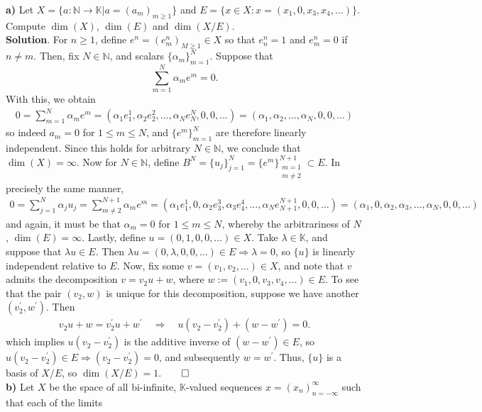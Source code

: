 \documentclass[10pt]{article}
\newcommand{\mbb}[1]{\mathbb{#1}}
\newcommand{\1}[1]{\mathbbm{1}_{#1}}
\begin{document}
    {\bf a)} Let $X=\{a:\mbb{N}\rightarrow\mbb{K}|a=(a_m)_{m\geq 1}\}$ and $E=\{x\in X:x=(x_1,0,x_3,x_4,\dots)\}$. Compute $\dim(X)$, $\dim(E)$ and $\dim(X/E)$.\\[5pt]
    {\bf Solution}. For $n\geq 1$, define $e^n=(e^n_m)_{M\geq 1}\in X$ so that $e^n_n=1$ and $e^n_m=0$ if $n\neq m$. Then, fix $N\in\mbb{N}$, and scalars $\{\alpha_m\}_{m=1}^N$. Suppose that
    \[\sum_{m=1}^N\alpha_me^m=0.\] 
    With this, we obtain
    \begin{align*}
        0=\sum_{m=1}^N\alpha_me^m=(\alpha_1e^1_1,\alpha_2e^2_2,\dots,\alpha_Ne^N_N,0,0,\dots)=(\alpha_1,\alpha_2,\dots,\alpha_N,0,0,\dots)
    \end{align*}
    so indeed $a_m=0$ for $1\leq m\leq N$, and $\{e^m\}_{m=1}^N$ are therefore linearly independent. Since this holds for arbitrary $N\in\mbb{N}$, we conclude that $\dim(X)=\infty$.
    Now for $N\in\mbb{N}$, define $B^N=\{u_j\}_{j=1}^N=\{e^m\}_{\substack{m=1 \\ m\neq 2}}^{N+1}\subset E$. In precisely the same manner,
    \begin{align*}
        0=\sum_{j=1}^N\alpha_ju_j=\sum_{m\neq 2}^{N+1}\alpha_me^m=(\alpha_1e^1_1,0,\alpha_2e^3_3,\alpha_3e^4_4,\dots,\alpha_Ne^{N+1}_{N+1},0,0,\dots)=(\alpha_1,0,\alpha_2,\alpha_3,\dots,\alpha_N,0,0,\dots)
    \end{align*}
    and again, it must be that $\alpha_m=0$ for $1\leq m\leq N$, whereby the arbitrariness of $N$, $\dim(E)=\infty$. Lastly, define $u=(0,1,0,0,\dots)\in X$. Take $\lambda\in\mbb{K}$, and suppose that $\lambda u\in E$. Then
    $\lambda u=(0,\lambda,0,0,\dots)\in E\Rightarrow \lambda=0$, so $\{u\}$ is linearly independent relative to $E$. Now, fix some $v=(v_1,v_2,\dots)\in X$, and note that $v$ admits the decomposition
    $v=v_2u+w$, where $w:=(v_1,0,v_3,v_4,\dots)\in E$. To see that the pair $(v_2,w)$ is unique for this decomposition, suppose we have another $(v_2^\prime,w^\prime)$. Then
    \begin{align*}
        v_2u+w=v_2^\prime u+w^\prime\quad\Rightarrow\quad u(v_2-v_2^\prime)+(w-w^\prime)=0.
    \end{align*}
    which implies $u(v_2-v_2^\prime)$ is the additive inverse of $(w-w^\prime)\in E$, so $u(v_2-v_2^\prime)\in E\Rightarrow (v_2-v_2^\prime)=0$, and subsequently $w=w^\prime$. Thus, $\{u\}$ is a basis of $X/E$, so $\dim(X/E)=1$.\hfill{$\qed$}\\[5pt]
    {\bf b)} Let $X$ be the space of all bi-infinite, $\mbb{K}$-valued sequences $x=(x_n)_{n=-\infty}^{\infty}$ such that each of the limits
\end{document}
